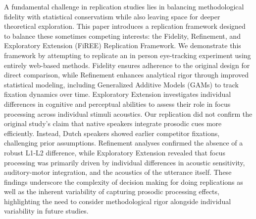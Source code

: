 A fundamental challenge in replication studies lies in balancing methodological fidelity with statistical conservatism while also leaving space for deeper theoretical exploration. This paper introduces a replication framework designed to balance these sometimes competing interests: the Fidelity, Refinement, and Exploratory Extension (FiREE) Replication Framework. We demonstrate this framework by attempting to replicate an in person eye-tracking experiment \citep{Ge2021} using entirely web-based methods. Fidelity ensures adherence to the original design for direct comparison, while Refinement enhances analytical rigor through improved statistical modeling, including Generalized Additive Models (GAMs) to track fixation dynamics over time. Exploratory Extension investigates individual differences in cognitive and perceptual abilities to assess their role in focus processing across individual stimuli acoustics. Our replication did not confirm the original study’s claim that native speakers integrate prosodic cues more efficiently. Instead, Dutch speakers showed earlier competitor fixations, challenging prior assumptions. Refinement analyses confirmed the absence of a robust L1-L2 difference, while Exploratory Extension revealed that focus processing was primarily driven by individual differences in acoustic sensitivity, auditory-motor integration, and the acoustics of the utterance itself. These findings underscore the complexity of decision making for doing replications as well as the inherent variability of capturing prosodic processing effects, highlighting the need to consider methodological rigor alongside individual variability in future studies.
